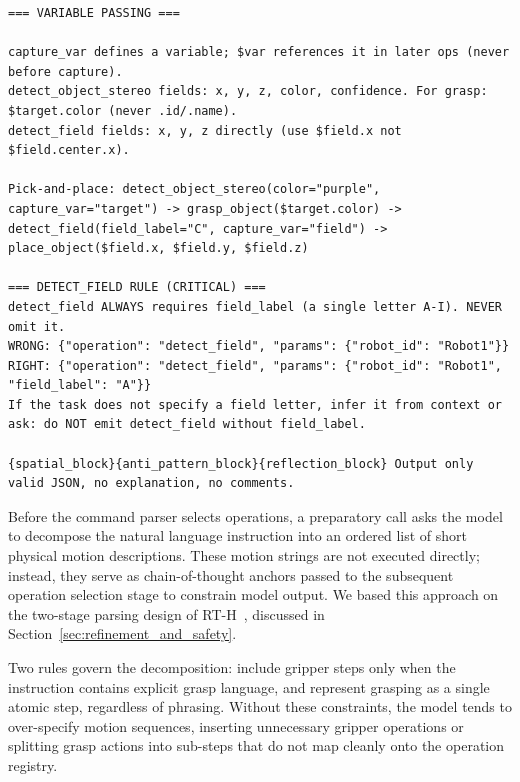 \documentclass[
     12pt,
     a4paper,
     BCOR=10mm,
     DIV=14,
     listof=totoc,
     bibliography=totoc,
     parskip,
     twoside,
     headsepline
     ]{scrreprt}
\begin{document}
\begin{lstlisting}[caption={The few-shot and rule-based system prompt for the command parser.}, extendedchars=true]
=== VARIABLE PASSING ===

capture_var defines a variable; $var references it in later ops (never before capture).
detect_object_stereo fields: x, y, z, color, confidence. For grasp: $target.color (never .id/.name).
detect_field fields: x, y, z directly (use $field.x not $field.center.x).

Pick-and-place: detect_object_stereo(color="purple", capture_var="target") -> grasp_object($target.color) -> detect_field(field_label="C", capture_var="field") -> place_object($field.x, $field.y, $field.z)

=== DETECT_FIELD RULE (CRITICAL) ===
detect_field ALWAYS requires field_label (a single letter A-I). NEVER omit it.
WRONG: {"operation": "detect_field", "params": {"robot_id": "Robot1"}}
RIGHT: {"operation": "detect_field", "params": {"robot_id": "Robot1", "field_label": "A"}}
If the task does not specify a field letter, infer it from context or ask: do NOT emit detect_field without field_label.

{spatial_block}{anti_pattern_block}{reflection_block} Output only valid JSON, no explanation, no comments.
\end{lstlisting}

Before the command parser selects operations, a preparatory call asks the model to decompose the natural language instruction into an ordered list of short physical motion descriptions. These motion strings are not executed directly; instead, they serve as chain-of-thought anchors passed to the subsequent operation selection stage to constrain model output. We based this approach on the two-stage parsing design of RT-H~\cite{belkhale2024rthactionhierarchiesusing}, discussed in Section~\ref{sec:refinement_and_safety}.

Two rules govern the decomposition: include gripper steps only when the instruction contains explicit grasp language, and represent grasping as a single atomic step, regardless of phrasing. Without these constraints, the model tends to over-specify motion sequences, inserting unnecessary gripper operations or splitting grasp actions into sub-steps that do not map cleanly onto the operation registry.
\end{document}
